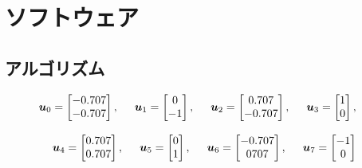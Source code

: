\documentclass[11pt,a4paper]{jsarticle}
\begin{document}
\section{ソフトウェア} 

\subsection{アルゴリズム}

  \begin{eqnarray}
    \bm{u}_0 = \begin{bmatrix} -0.707 \\ -0.707 \end{bmatrix}, \hspace{5mm} \nonumber
    \bm{u}_1 = \begin{bmatrix}  0     \\ -1     \end{bmatrix}, \hspace{5mm}
    \bm{u}_2 = \begin{bmatrix}  0.707 \\ -0.707 \end{bmatrix}, \hspace{5mm}
    \bm{u}_3 = \begin{bmatrix}  1     \\  0     \end{bmatrix}, \hspace{5mm} \\[3mm]
    \bm{u}_4 = \begin{bmatrix}  0.707 \\  0.707 \end{bmatrix}, \hspace{5mm} \nonumber
    \bm{u}_5 = \begin{bmatrix}  0     \\  1     \end{bmatrix}, \hspace{5mm}
    \bm{u}_6 = \begin{bmatrix} -0.707 \\  0707  \end{bmatrix}, \hspace{5mm}
    \bm{u}_7 = \begin{bmatrix} -1     \\  0     \end{bmatrix}  \hspace{5mm} \\ \nonumber
  \end{eqnarray}
\end{document}
